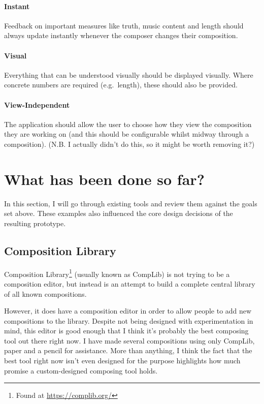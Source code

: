 \documentclass[12pt]{article}
\begin{document}
\paragraph{Instant} Feedback on important measures like truth, music content and length should
always update instantly whenever the composer changes their composition.

\paragraph{Visual} Everything that can be understood visually should be displayed visually.  Where
concrete numbers are required (e.g.\ length), these should also be provided.

\paragraph{View-Independent} The application should allow the user to choose how they view the
composition they are working on (and this should be configurable whilst midway through a
composition).  (N.B. I actually didn't do this, so it might be worth removing it?)



\pagebreak

\section{What has been done so far?}

In this section, I will go through existing tools and review them against the goals set above.
These examples also influenced the core design decisions of the resulting prototype.

\subsection{Composition Library}

Composition Library\footnote{Found at \url{https://complib.org/}} (usually
known as CompLib) is not trying to be a composition editor, but instead is an attempt to build a
complete central library of all known compositions.

However, it does have a composition editor in order to allow people to add new compositions to the
library.  Despite not being designed with experimentation in mind, this editor is good enough that
I think it's probably the best composing tool out there right now.  I have made several
compositions using only CompLib, paper and a pencil for assistance.  More than anything, I think the
fact that the best tool right now isn't even designed for the purpose highlights how much promise a
custom-designed composing tool holds.
\end{document}
